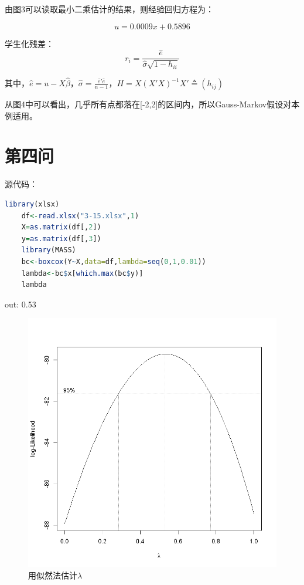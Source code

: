 \documentclass[a4paper,12pt]{article}
\begin{document}
由图3可以读取最小二乘估计的结果，则经验回归方程为：

$$u=0.0009x+0.5896$$

学生化残差：$$r_i=\frac{\hat{e}}{\hat{\sigma}\sqrt{1-h_{ii}}}$$

其中，$\hat{e}=u-X\hat{\beta}$，$\hat{\sigma}=\frac{\hat{e}'\hat{e}}{n-1}$，$H=X(X'X)^{-1}X'\triangleq (h_{ij})$

从图4中可以看出，几乎所有点都落在[-2,2]的区间内，所以Gauss-Markov假设对本例适用。

\section{第四问}

源代码：

\begin{lstlisting}[language=r,breaklines]
	library(xlsx)
	df<-read.xlsx("3-15.xlsx",1)
	X=as.matrix(df[,2])
	y=as.matrix(df[,3])
	library(MASS)
	bc<-boxcox(Y~X,data=df,lambda=seq(0,1,0.01))
	lambda<-bc$x[which.max(bc$y)]
	lambda
\end{lstlisting}

out: 0.53
\begin{figure}[htbp]
	\centering
	\includegraphics[scale=0.4]{out6.png}
	\caption{用似然法估计$\lambda$}
\end{figure}
\end{document}
